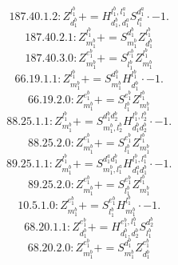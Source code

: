 \documentclass[letterpaper,10pt,fleqn,leqno,onecolumn]{article}
\begin{document}
\begin{equation} \;\;\;\;\;\;  187.40.1.2: Z^{l_{1}^{b}}_{d_{1}^{b}}+=H^{l_{1}^{b},l_{1}^{a}}_{d_{1}^{b},d_{1}^{a}}S^{d_{1}^{a}}_{l_{1}^{a}}\cdot -1. \end{equation}
\begin{equation} \;\;\;\;\;\;  187.40.2.1: Z^{l_{1}^{b}}_{m_{1}^{b}}+=S^{d_{1}^{b}}_{m_{1}^{b}}Z^{l_{1}^{b}}_{d_{1}^{b}} \end{equation}
\begin{equation} \;\;\;\;\;\;  187.40.3.0: Z^{e_{1}^{b}}_{m_{1}^{b}}+=S^{e_{1}^{b}}_{l_{1}^{b}}Z^{l_{1}^{b}}_{m_{1}^{b}} \end{equation}
\begin{equation} \;\;\;\;\;\;  66.19.1.1: Z^{l_{1}^{b}}_{m_{1}^{b}}+=S^{d_{1}^{b}}_{m_{1}^{b}}H^{l_{1}^{b}}_{d_{1}^{b}}\cdot -1. \end{equation}
\begin{equation} \;\;\;\;\;\;  66.19.2.0: Z^{e_{1}^{b}}_{m_{1}^{b}}+=S^{e_{1}^{b}}_{l_{1}^{b}}Z^{l_{1}^{b}}_{m_{1}^{b}} \end{equation}
\begin{equation} \;\;\;\;\;\;  88.25.1.1: Z^{l_{1}^{b}}_{m_{1}^{b}}+=S^{d_{1}^{b}d_{2}^{b}}_{m_{1}^{b},l_{2}^{b}}H^{l_{1}^{b},l_{2}^{b}}_{d_{1}^{b}d_{2}^{b}}\cdot -1. \end{equation}
\begin{equation} \;\;\;\;\;\;  88.25.2.0: Z^{e_{1}^{b}}_{m_{1}^{b}}+=S^{e_{1}^{b}}_{l_{1}^{b}}Z^{l_{1}^{b}}_{m_{1}^{b}} \end{equation}
\begin{equation} \;\;\;\;\;\;  89.25.1.1: Z^{l_{1}^{b}}_{m_{1}^{b}}+=S^{d_{1}^{a}d_{1}^{b}}_{m_{1}^{b},l_{1}^{a}}H^{l_{1}^{b},l_{1}^{a}}_{d_{1}^{a}d_{1}^{b}}\cdot -1. \end{equation}
\begin{equation} \;\;\;\;\;\;  89.25.2.0: Z^{e_{1}^{b}}_{m_{1}^{b}}+=S^{e_{1}^{b}}_{l_{1}^{b}}Z^{l_{1}^{b}}_{m_{1}^{b}} \end{equation}
\begin{equation} \;\;\;\;\;\;  10.5.1.0: Z^{e_{1}^{b}}_{m_{1}^{b}}+=S^{e_{1}^{b}}_{l_{1}^{b}}H^{l_{1}^{b}}_{m_{1}^{b}}\cdot -1. \end{equation}
\begin{equation} \;\;\;\;\;\;  68.20.1.1: Z^{e_{1}^{b}}_{d_{1}^{b}}+=H^{e_{1}^{b},l_{1}^{b}}_{d_{1}^{b},d_{2}^{b}}S^{d_{2}^{b}}_{l_{1}^{b}} \end{equation}
\begin{equation} \;\;\;\;\;\;  68.20.2.0: Z^{e_{1}^{b}}_{m_{1}^{b}}+=S^{d_{1}^{b}}_{m_{1}^{b}}Z^{e_{1}^{b}}_{d_{1}^{b}} \end{equation}
\end{document}
